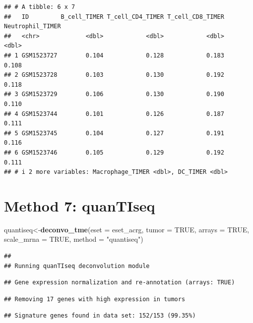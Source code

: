 \documentclass[
  12pt,
]{book}
\newenvironment{Shaded}{\begin{snugshade}}{\end{snugshade}}
\newcommand{\AttributeTok}[1]{\textcolor[rgb]{0.13,0.29,0.53}{#1}}
\newcommand{\ConstantTok}[1]{\textcolor[rgb]{0.56,0.35,0.01}{#1}}
\newcommand{\FunctionTok}[1]{\textcolor[rgb]{0.13,0.29,0.53}{\textbf{#1}}}
\newcommand{\NormalTok}[1]{#1}
\newcommand{\OtherTok}[1]{\textcolor[rgb]{0.56,0.35,0.01}{#1}}
\newcommand{\StringTok}[1]{\textcolor[rgb]{0.31,0.60,0.02}{#1}}
\begin{document}
\begin{verbatim}
## # A tibble: 6 x 7
##   ID         B_cell_TIMER T_cell_CD4_TIMER T_cell_CD8_TIMER Neutrophil_TIMER
##   <chr>             <dbl>            <dbl>            <dbl>            <dbl>
## 1 GSM1523727        0.104            0.128            0.183            0.108
## 2 GSM1523728        0.103            0.130            0.192            0.118
## 3 GSM1523729        0.106            0.130            0.190            0.110
## 4 GSM1523744        0.101            0.126            0.187            0.111
## 5 GSM1523745        0.104            0.127            0.191            0.116
## 6 GSM1523746        0.105            0.129            0.192            0.111
## # i 2 more variables: Macrophage_TIMER <dbl>, DC_TIMER <dbl>
\end{verbatim}

\hypertarget{method-7-quantiseq}{%
\section{Method 7: quanTIseq}\label{method-7-quantiseq}}

\begin{Shaded}
\begin{Highlighting}[]
\NormalTok{quantiseq}\OtherTok{\textless{}{-}}\FunctionTok{deconvo\_tme}\NormalTok{(}\AttributeTok{eset =}\NormalTok{ eset\_acrg, }\AttributeTok{tumor =} \ConstantTok{TRUE}\NormalTok{, }\AttributeTok{arrays =} \ConstantTok{TRUE}\NormalTok{, }\AttributeTok{scale\_mrna =} \ConstantTok{TRUE}\NormalTok{, }\AttributeTok{method =} \StringTok{"quantiseq"}\NormalTok{)}
\end{Highlighting}
\end{Shaded}

\begin{verbatim}
## 
## Running quanTIseq deconvolution module
\end{verbatim}

\begin{verbatim}
## Gene expression normalization and re-annotation (arrays: TRUE)
\end{verbatim}

\begin{verbatim}
## Removing 17 genes with high expression in tumors
\end{verbatim}

\begin{verbatim}
## Signature genes found in data set: 152/153 (99.35%)
\end{verbatim}
\end{document}

